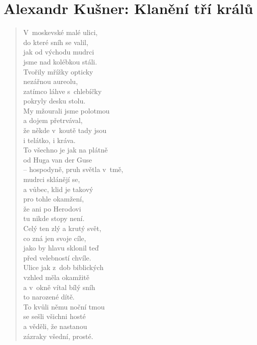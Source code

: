 \section{Alexandr Kušner: Klanění tří králů}

\begin{verse}
V moskevské malé ulici, \\
do které sníh se valil, \\
jak od východu mudrci \\
jsme nad kolébkou stáli. \\
Tvořily mřížky opticky \\
nezářnou aureolu, \\
zatímco láhve s chlebíčky \\
pokryly desku stolu. \\
My mžourali jsme polotmou \\
a dojem přetrvával, \\
že někde v koutě tady jsou \\
i telátko, i kráva. \\
To všechno je jak na plátně \\
od Huga van der Guse \\
-- hospodyně, pruh světla v tmě, \\
mudrci sklánějí se, \\
a vůbec, klid je takový \\
pro tohle okamžení, \\
že ani po Herodovi \\
tu nikde stopy není. \\
Celý ten zlý a krutý svět, \\
co zná jen svoje cíle, \\
jako by hlavu sklonil teď \\
před velebností chvíle. \\
Ulice jak z dob biblických \\
vzhled měla okamžitě \\
a v okně vítal bílý sníh \\
to narozené dítě. \\
To kvůli němu noční tmou \\
se sešli všichni hosté \\
a věděli, že nastanou \\
zázraky všední, prosté.
\end{verse}

